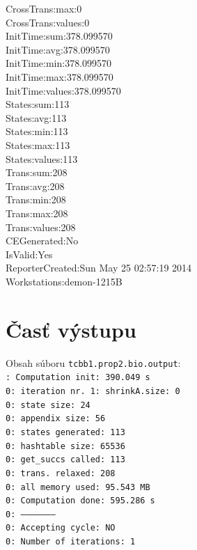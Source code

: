 \documentclass[11pt,final,oneside]{fithesis}
\begin{document}
{CrossTrans:max:0\\
CrossTrans:values:0\\
InitTime:sum:378.099570\\
InitTime:avg:378.099570\\
InitTime:min:378.099570\\
InitTime:max:378.099570\\
InitTime:values:378.099570\\
States:sum:113\\
States:avg:113\\
States:min:113\\
States:max:113\\
States:values:113\\
Trans:sum:208\\
Trans:avg:208\\
Trans:min:208\\
Trans:max:208\\
Trans:values:208\\
CEGenerated:No\\
IsValid:Yes\\
ReporterCreated:Sun May 25 02:57:19 2014\\
Workstations:demon-1215B\\
}

\section{\v Cas\v t v\'ystupu}
\label{sec:prop2output}
Obsah s\'uboru {\tt tcbb1.prop2.bio.output}:\\

{\tt{}: Computation init:  390.049 s\\
0: iteration nr. 1: shrinkA.size: 0\\
 0: state size:		24\\
 0: appendix size:	56\\
 0: states generated:	113\\
 0: hashtable size:	65536\\
 0: get\_succs called:	113\\
 0: trans. relaxed:	208\\
 0: all memory used:	95.543 MB\\
 0: Computation done:	595.286 s\\
 0: --------------------\\
 0: Accepting cycle:	NO\\
 0: Number of iterations:	1\\
}
\end{document}
